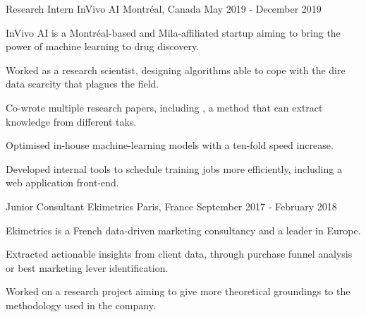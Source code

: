 

\begin{cventries}

    \cventry
    {Research Intern} %
    {InVivo AI} %
    {Montréal, Canada} %
    {May 2019 - December 2019} %
    {
        InVivo AI is a Montréal-based and Mila-affiliated startup aiming to bring the power of machine learning to drug discovery.
        \vspace{4.5mm}
        \begin{cvitems} %
          \item Worked as a research scientist, designing algorithms able to cope with the dire data scarcity that plagues the field.
          \item Co-wrote multiple research papers, including , a method that can extract knowledge from different taks.
          \item Optimised in-house machine-learning models with a ten-fold speed increase.
          \item Developed internal tools to schedule training jobs more efficiently, including a web application front-end.
        \end{cvitems}
    }

    \cventry
    {Junior Consultant} %
    {Ekimetrics} %
    {Paris, France} %
    {September 2017 - February 2018} %
    {
        Ekimetrics is a French data-driven marketing consultancy and a leader in Europe.
        \vspace{4.5mm}
        \begin{cvitems} %
            \item Extracted actionable insights from client data, through purchase funnel analysis or best marketing lever identification.
            \item Worked on a research project aiming to give more theoretical groundings to the methodology used in the company.
        \end{cvitems}
    }


\end{cventries}
